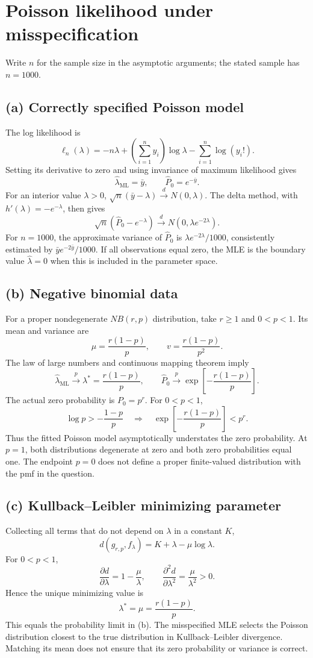\section{Poisson likelihood under misspecification}
Write $n$ for the sample size in the asymptotic arguments;
the stated sample has $n=1000$.

\subsection*{(a) Correctly specified Poisson model}
The log likelihood is
\[
\ell_n(\lambda)=-n\lambda+
\left(\sum_{i=1}^ny_i\right)\log\lambda-\sum_{i=1}^n\log(y_i!).
\]
Setting its derivative to zero and using invariance of maximum
likelihood gives
\[
\boxed{\widehat\lambda_{\mathrm{ML}}=\bar y,\qquad
\widehat P_0=e^{-\bar y}.}
\]
For an interior value $\lambda>0$,
$\sqrt n(\bar y-\lambda)\xrightarrow{d}N(0,\lambda)$.
The delta method, with $h'(\lambda)=-e^{-\lambda}$, then gives
\[
\boxed{\sqrt n(\widehat P_0-e^{-\lambda})
\xrightarrow{d}N(0,\lambda e^{-2\lambda}).}
\]
For $n=1000$, the approximate variance of $\widehat P_0$ is
$\lambda e^{-2\lambda}/1000$, consistently estimated by
$\bar y e^{-2\bar y}/1000$. If all observations equal zero, the MLE
is the boundary value $\widehat\lambda=0$ when this is included
in the parameter space.

\subsection*{(b) Negative binomial data}
For a proper nondegenerate $NB(r,p)$ distribution, take $r\geq1$
and $0<p<1$. Its mean and variance are
\[
\mu=\frac{r(1-p)}p,\qquad v=\frac{r(1-p)}{p^2}.
\]
The law of large numbers and continuous mapping theorem imply
\[
\boxed{\widehat\lambda_{\mathrm{ML}}\xrightarrow{p}
\lambda^*=\frac{r(1-p)}p,\qquad
\widehat P_0\xrightarrow{p}
\exp\left[-\frac{r(1-p)}p\right].}
\]
The actual zero probability is $P_0=p^r$.
For $0<p<1$,
\[
\log p>-\frac{1-p}{p}
\quad\Longrightarrow\quad
\exp\left[-\frac{r(1-p)}p\right]<p^r.
\]
Thus the fitted Poisson model asymptotically understates the zero
probability. At $p=1$, both distributions degenerate at zero and both
zero probabilities equal one. The endpoint $p=0$ does not define a
proper finite-valued distribution with the pmf in the question.

\clearpage
\subsection*{(c) Kullback--Leibler minimizing parameter}
Collecting all terms that do not depend on $\lambda$ in a constant $K$,
\[
d(g_{r,p},f_\lambda)=K+\lambda-\mu\log\lambda.
\]
For $0<p<1$,
\[
\frac{\partial d}{\partial\lambda}=1-\frac\mu\lambda,\qquad
\frac{\partial^2d}{\partial\lambda^2}=\frac\mu{\lambda^2}>0.
\]
Hence the unique minimizing value is
\[
\boxed{\lambda^*=\mu=\frac{r(1-p)}p.}
\]
This equals the probability limit in (b). The misspecified MLE
selects the Poisson distribution closest to the true distribution
in Kullback--Leibler divergence. Matching its mean does not ensure
that its zero probability or variance is correct.

